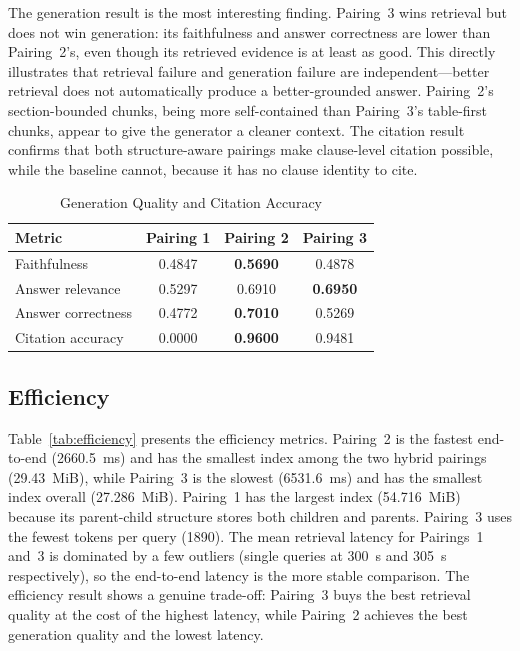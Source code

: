 \documentclass[conference]{IEEEtran}
\begin{document}
The generation result is the most interesting finding. Pairing~3 wins retrieval but does not win generation: its faithfulness and answer correctness are lower than Pairing~2's, even though its retrieved evidence is at least as good. This directly illustrates that retrieval failure and generation failure are independent---better retrieval does not automatically produce a better-grounded answer. Pairing~2's section-bounded chunks, being more self-contained than Pairing~3's table-first chunks, appear to give the generator a cleaner context. The citation result confirms that both structure-aware pairings make clause-level citation possible, while the baseline cannot, because it has no clause identity to cite.

\begin{table}[t]
\caption{Generation Quality and Citation Accuracy}
\label{tab:generation}
\centering
\begin{tabular}{lccc}
\toprule
Metric & Pairing 1 & Pairing 2 & Pairing 3 \\
\midrule
Faithfulness & 0.4847 & \textbf{0.5690} & 0.4878 \\
Answer relevance & 0.5297 & 0.6910 & \textbf{0.6950} \\
Answer correctness & 0.4772 & \textbf{0.7010} & 0.5269 \\
Citation accuracy & 0.0000 & \textbf{0.9600} & 0.9481 \\
\bottomrule
\end{tabular}
\end{table}

\subsection{Efficiency}
Table~\ref{tab:efficiency} presents the efficiency metrics. Pairing~2 is the fastest end-to-end (2660.5~ms) and has the smallest index among the two hybrid pairings (29.43~MiB), while Pairing~3 is the slowest (6531.6~ms) and has the smallest index overall (27.286~MiB). Pairing~1 has the largest index (54.716~MiB) because its parent-child structure stores both children and parents. Pairing~3 uses the fewest tokens per query (1890). The mean retrieval latency for Pairings~1 and~3 is dominated by a few outliers (single queries at 300~s and 305~s respectively), so the end-to-end latency is the more stable comparison. The efficiency result shows a genuine trade-off: Pairing~3 buys the best retrieval quality at the cost of the highest latency, while Pairing~2 achieves the best generation quality and the lowest latency.
\end{document}
